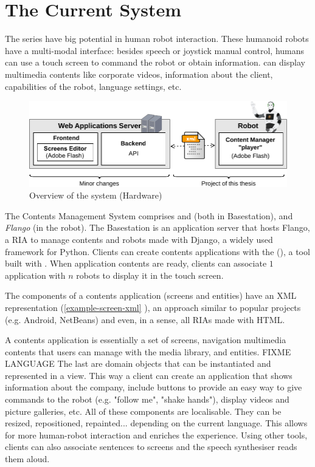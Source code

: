\section{The Current System}
The \reem{} series have big potential in human robot interaction. 
These humanoid robots have a multi-modal interface: besides speech or joystick manual control, humans can use a touch screen to command the robot or obtain information.
\reem{} can display multimedia contents like corporate videos, information about the client, capabilities of the robot, language settings, etc.

\begin{figure}[htb]
    \label{fig:intro-system-overview}
    \centering
    \includegraphics[width=14cm]{figures/intro-system-overview}
    \caption{Overview of the system (Hardware)}
\end{figure}

The Contents Management System comprises \emph{\flangofe} and \emph{\flangobe} (both in Basestation), and \emph{Flango \cm} (in the robot).
The Basestation is an application server that hosts Flango, a \ac{RIA} to manage contents and robots made with Django, a widely used framework for Python. 
Clients can create contents applications  with the \flangofe (\se), a tool built with \flash .
When application contents are ready, clients can associate $1$ application with $n$ robots to display it in the touch screen.



The components of a contents application (screens and entities) have an \ac{XML} representation (\ref{example-screen-xml} ), an approach similar to popular projects (e.g. Android, NetBeans) and even, in a sense, all \acp{RIA} made with \ac{HTML}.

A contents application is essentially a set of screens, navigation multimedia contents that users can manage with the media library, and entities. 
FIXME LANGUAGE The last are domain objects that can be instantiated and represented in a view. 
This way a client can create an application that shows information about the company, include buttons to provide an easy way to give commands to the robot (e.g. "follow me", "shake hands"), display videos and picture galleries, etc.
All of these components are localisable. 
They can be resized, repositioned, repainted... depending on the current language.
This allows for more human-robot interaction and enriches the experience. 
Using other tools, clients can also associate sentences to screens and the speech synthesiser reads them aloud.

